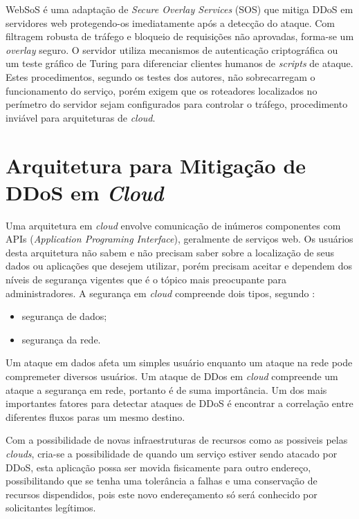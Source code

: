 \documentclass[a4paper, 12pt]{article}
\begin{document}
WebSoS \cite{Stavrou:2005:WOS:1090583.1648614} é uma adaptação de \emph{Secure Overlay Services} (SOS) \cite{Keromytis:2002:SSO:964725.633032} que mitiga DDoS em servidores web protegendo-os imediatamente após a detecção do ataque. Com filtragem robusta de tráfego e bloqueio de requisições não aprovadas, forma-se um \emph{overlay} seguro. O servidor utiliza mecanismos de autenticação criptográfica ou um teste gráfico de Turing \cite{Dietrich00analyzingdistributed} para diferenciar clientes humanos de \emph{scripts} de ataque. Estes procedimentos, segundo os testes dos autores, não sobrecarregam o funcionamento do serviço, porém exigem que os roteadores localizados no perímetro do servidor sejam configurados para controlar o tráfego, procedimento inviável para arquiteturas de \emph{cloud}.
 



\section{Arquitetura para Mitigação de DDoS em \emph{Cloud}}


Uma arquitetura em \emph{cloud} envolve comunicação de inúmeros componentes com APIs (\emph{Application Programing Interface}), geralmente de serviços web. Os usuários desta arquitetura não sabem e não precisam saber sobre a localização de seus dados ou aplicações que desejem utilizar, porém precisam aceitar e dependem  dos níveis de segurança vigentes que é o tópico mais preocupante para administradores.
A segurança em \emph{cloud} compreende dois tipos, segundo \cite{Dhage:2011:IDS:1980022.1980076}:  
\begin{itemize}
\item segurança de dados;
\item segurança da rede.
\end{itemize}

Um ataque em dados afeta um simples usuário enquanto um ataque na rede pode compremeter diversos usuários. Um ataque de DDos em \emph{cloud} compreende um ataque a segurança em rede, portanto é de suma importância. 
Um dos mais importantes fatores para detectar ataques de DDoS é encontrar a correlação entre diferentes fluxos paras um mesmo destino.

Com a possibilidade de novas infraestruturas de recursos como as possiveis pelas \emph{clouds}, cria-se a possibilidade de quando um serviço estiver sendo atacado por DDoS, esta aplicação possa ser movida fisicamente para outro endereço, possibilitando que se tenha uma tolerância a falhas e uma conservação de recursos dispendidos, pois este novo endereçamento só será conhecido por solicitantes legítimos.
\end{document}
